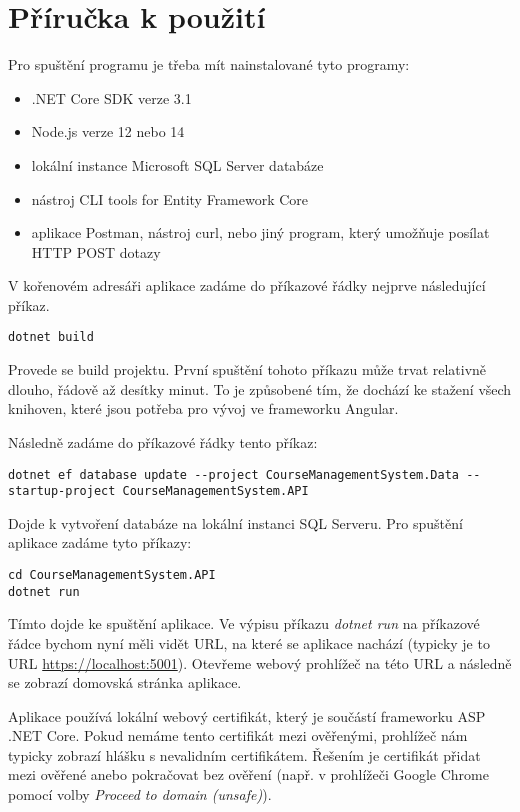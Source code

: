 \section{Příručka k použití}
Pro spuštění programu je třeba mít nainstalované tyto programy:
\begin{itemize}
	\item .NET Core SDK verze 3.1
	\item Node.js verze 12 nebo 14
	\item lokální instance Microsoft SQL Server databáze
	\item nástroj CLI tools for Entity Framework Core
	\item aplikace Postman, nástroj curl, nebo jiný program, který umožňuje posílat HTTP POST dotazy
\end{itemize}

V kořenovém adresáři aplikace zadáme do příkazové řádky nejprve následující příkaz.

\begin{lstlisting}
dotnet build
\end{lstlisting}

Provede se build projektu. První spuštění tohoto příkazu může trvat relativně dlouho, řádově až desítky minut.
To je způsobené tím, že dochází ke stažení všech knihoven, které jsou potřeba pro vývoj ve frameworku Angular.

Následně zadáme do příkazové řádky tento příkaz:

\begin{lstlisting}
dotnet ef database update --project CourseManagementSystem.Data --startup-project CourseManagementSystem.API
\end{lstlisting}

Dojde k vytvoření databáze na lokální instanci SQL Serveru.
Pro spuštění aplikace zadáme tyto příkazy:
\begin{lstlisting}
cd CourseManagementSystem.API
dotnet run
\end{lstlisting}

Tímto dojde ke spuštění aplikace. Ve výpisu příkazu \textit{dotnet run} na příkazové řádce bychom nyní měli vidět URL, na které se aplikace nachází (typicky je to URL \url{https://localhost:5001}). Otevřeme webový prohlížeč na této URL a následně se zobrazí domovská stránka aplikace.

Aplikace používá lokální webový certifikát, který je součástí frameworku ASP .NET Core. 
Pokud nemáme tento certifikát mezi ověřenými, prohlížeč nám typicky zobrazí hlášku s nevalidním certifikátem.
Řešením je certifikát přidat mezi ověřené anebo pokračovat bez ověření (např. v prohlížeči Google Chrome pomocí volby \textit{Proceed to domain (unsafe)}).

